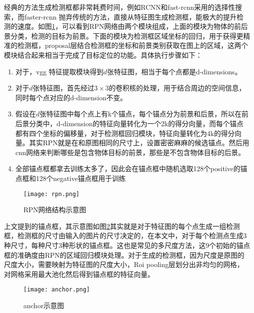 经典的方法生成检测框都非常耗费时间，例如RCNN和fast-rcnn采用的选择性搜索，而faster-rcnn 抛弃传统的方法，直接从特征图生成检测框，能极大的提升检测的速度。如图\ref{fig:rpn}，可以看到RPN网络由两个模块组成，上面的模块为物体的前后景分类，检测的目标为前景。下面的模块为检测框区域坐标的回归，用于获得更精准的检测框，proposal层结合检测框的坐标和前景类别获取在图上的区域，这两个模块结合起来相当于完成了目标定位的功能。具体执行步骤如下：
\begin{enumerate}
    \item 对于，vgg 特征提取模块得到$d$张特征图，相当于每个点都是d-dimensions。
    \item 对于$d$张特征图，首先经过$3 \times 3$的卷积核的处理，用于结合周边的空间信息，同时每个点对应的d-dimension不变。
    \item 假设在$d$张特征图中每个点上有k个锚点，每个锚点分为前景和后景，所以在前后景分类中，d-dimension的特征向量转化为一个2k的得分向量，而每个锚点都有四个坐标的偏移量，对于检测框回归模块，特征向量转化为4k的得分向量。其实RPN就是在和原图相同的尺寸上，设置密密麻麻的候选锚点。然后用cnn网络来判断哪些是包含物体目标的前景，那些是不包含物体目标的后景。
    \item 全部锚点框都拿去训练太多了，因此会在锚点框中随机选取128个positive的锚点框和128个negative锚点框用于训练
\end{enumerate}
\begin{figure}[htpb]
	\centering
	\texttt{[image: rpn.png]}
    \caption{RPN网络结构示意图}
	\vspace*{-3.5mm}
	\label{fig:rpn}
\end{figure}
上文提到的锚点框，其示意图如图\ref{fig:anchor}其实就是对于特征图的每个点生成一组检测框，检测框的尺寸由输入的图片的尺寸决定的，在本文中，对于每个检测点生成3种尺寸，每种尺寸3种形状的锚点框。这也是常见的多尺度方法，这9个初始的锚点框的准确度由RPN的区域回归模块处理。对于生成的检测框，因为尺度是原图的尺度大小，需要映射为特征图的尺度大小，Roi pooling层划分出非均匀的网格，对网格采用最大池化然后得到锚点框的特征向量。
\begin{figure}[htpb]
	\centering
	\texttt{[image: anchor.png]}
    \caption{anchor示意图}
	\vspace*{-3.5mm}
	\label{fig:anchor}
\end{figure}


